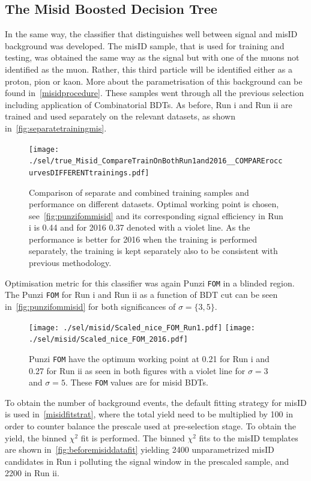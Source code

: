 \subsection{The Misid Boosted Decision Tree}
\label{misidbdt}
In the same way, the classifier that distinguishes well between signal and misID background was developed. The misID sample, that is used for training and testing, was obtained the same way as the signal but with one of the muons not identified as the muon. Rather, this third particle will be identified either as a proton, pion or kaon. More about the parametrisation of this background can be found in~\autoref{misidprocedure}. These samples went through all the previous selection including application of Combinatorial BDTs. As before, Run \Rn{1} and Run \Rn{2} are trained and used separately on the relevant datasets, as shown in~\autoref{fig:separatetrainingmis}. 


\begin{figure}[ht]
\centering
\texttt{[image: ./sel/true\_Misid\_CompareTrainOnBothRun1and2016\_\_COMPAREroccurvesDIFFERENTtrainings.pdf]}
	\caption{Comparison of separate and combined training samples and performance on different datasets. Optimal working point is chosen, see~\autoref{fig:punzifommisid} and its corresponding signal efficiency in Run \Rn{1} is 0.44 and for 2016 0.37 denoted with a violet line. As the performance is better for 2016 when the training is performed separately, the training is kept separately also to be consistent with previous methodology.}
\label{fig:separatetrainingmis}
\end{figure}

Optimisation metric for this classifier was again Punzi \texttt{FOM} in a blinded region. The Punzi \texttt{FOM} for Run \Rn{1} and Run \Rn{2} as a function of BDT cut can be seen in~\autoref{fig:punzifommisid} for both significances of $\sigma=\{3,5\}$.

\begin{figure}[ht]
\centering
	\texttt{[image: ./sel/misid/Scaled\_nice\_FOM\_Run1.pdf]}%
	\texttt{[image: ./sel/misid/Scaled\_nice\_FOM\_2016.pdf]}%
	\caption{ Punzi \texttt{FOM} have the optimum working point at 0.21 for Run \Rn{1} and 0.27 for Run \Rn{2} as seen in both figures with a violet line for $\sigma=3$ and $\sigma=5$. These \texttt{FOM} values are for misid BDTs.}
\label{fig:punzifommisid}
\end{figure}


To obtain the number of background events, the default fitting strategy for misID is used in~\autoref{misidfitstrat}, where the total yield need to be multiplied by 100 in order to counter balance the prescale used at pre-selection stage. To obtain the yield, the binned $\chi^{2}$ fit is performed. The binned $\chi^{2}$ fits to the misID templates are shown in~\autoref{fig:beforemisiddatafit} yielding 2400 unparametrized misID candidates in Run \Rn{1} polluting the signal window in the prescaled sample, and 2200 in Run \Rn{2}. 

